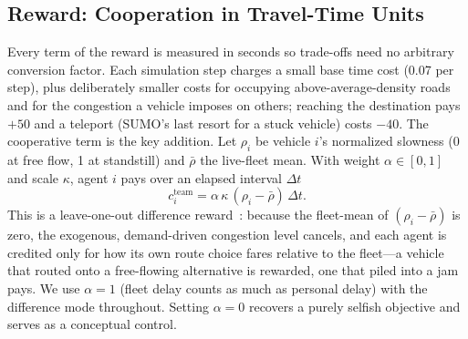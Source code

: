 \subsection{Reward: Cooperation in Travel-Time Units}
Every term of the reward is measured in seconds so trade-offs need no arbitrary
conversion factor. Each simulation step charges a small base time cost (0.07 per step),
plus deliberately smaller costs for occupying above-average-density roads and for the
congestion a vehicle imposes on others; reaching the destination pays $+50$ and a
teleport (SUMO's last resort for a stuck vehicle) costs $-40$. The cooperative term is
the key addition. Let $\rho_i$ be vehicle $i$'s normalized slowness (0 at free flow, 1 at
standstill) and $\bar\rho$ the live-fleet mean. With weight $\alpha\in[0,1]$ and scale
$\kappa$, agent $i$ pays over an elapsed interval $\Delta t$
\begin{equation}
  c^{\text{team}}_i = \alpha\,\kappa\,(\rho_i - \bar\rho)\,\Delta t .
\end{equation}
This is a leave-one-out difference reward~\cite{wolpert2001collectives}: because the
fleet-mean of $(\rho_i-\bar\rho)$ is zero, the exogenous, demand-driven congestion level
cancels, and each agent is credited only for how its own route choice fares relative to
the fleet---a vehicle that routed onto a free-flowing alternative is rewarded, one that
piled into a jam pays. We use $\alpha{=}1$ (fleet delay counts as much as personal delay)
with the difference mode throughout. Setting $\alpha{=}0$ recovers a purely selfish
objective and serves as a conceptual control.

